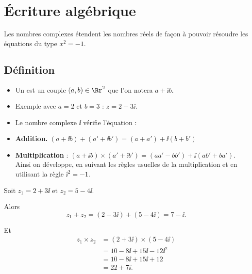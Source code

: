 \documentclass[11pt,class=report,crop=false]{standalone}
\begin{document}





\section{Écriture algébrique}

Les nombres complexes étendent les nombres réels de façon à pouvoir résoudre les équations du type $x^2=-1$.


\subsection{Définition}

\begin{itemize}
  \item Un  est un couple $(a, b) \in \Rr^2$ que l'on notera $a + \ii b$. 
  
  \item Exemple avec $a=2$ et $b=3$ : $z = 2 + 3\ii$.  
  
  \item Le nombre complexe $\ii$ vérifie l'équation : 
  
  
  \item \textbf{Addition.} $(a + \ii b) + (a' + \ii b') =
  (a + a') + \ii  (b + b')$
  \item \textbf{Multiplication} : $(a + \ii b) \times (a' + \ii b')
    = (aa' - bb') + \ii  (ab' + ba')$. 
    Ainsi on développe, en suivant les règles usuelles de la multiplication et
    en utilisant la règle $\ii ^2 = - 1$.
\end{itemize}

 
  
\begin{exemple}
Soit $z_1 = 2+3\ii$ et $z_2 = 5-4\ii$.

Alors
$$z_1+ z_2 = (2+3\ii) + (5-4\ii) = 7 - \ii. $$
  
Et
\begin{align*}
z_1  \times z_2
  &= (2+3\ii) \times (5-4\ii) \\
  &= 10 -8\ii +15\ii -12\ii^2 \\
  &= 10 -8\ii +15\ii +12 \\ 
  &= 22 +7\ii.
\end{align*}


\end{exemple}
\end{document}
